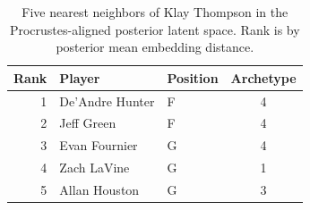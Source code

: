 \begin{table}[htbp]
  \centering\small
  \begin{tabular}{rllc}
    \toprule
    Rank & Player & Position & Archetype \\
    \midrule
    1 & De'Andre Hunter & F & 4 \\
    2 & Jeff Green & F & 4 \\
    3 & Evan Fournier & G & 4 \\
    4 & Zach LaVine & G & 1 \\
    5 & Allan Houston & G & 3 \\
    \bottomrule
  \end{tabular}
  \caption{Five nearest neighbors of Klay Thompson in the Procrustes-aligned posterior latent space. Rank is by posterior mean embedding distance.}
  \label{tab:Klay_Thompson_neighbors}
\end{table}


